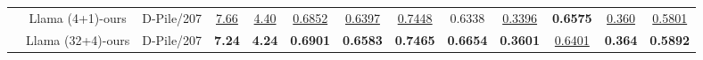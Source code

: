 \begin{table*}[t!]
{\begin{tabular}{lcccccccccccc}
            &Llama (4+1)-ours &D-Pile/207 &\underline{7.66} & \underline{4.40} & \underline{0.6852} & \underline{0.6397} & \underline{0.7448} & 0.6338 & \underline{0.3396} & \textbf{0.6575} & \underline{0.360} & \underline{0.5801} \\ 
            
            & Llama (32+4)-ours & D-Pile/207 & \textbf{7.24} & \textbf{4.24} & \textbf{0.6901} & \textbf{0.6583} & \textbf{0.7465} & \textbf{0.6654} & \textbf{0.3601} & \underline{0.6401} & \textbf{0.364} & \textbf{0.5892} \\  
            \bottomrule      
        \end{tabular}
        }   
\end{table*}